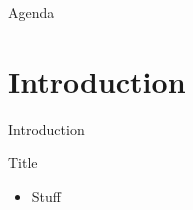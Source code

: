 {\aauwavesbg%
\begin{frame} %
    \titlepage
\end{frame}}

\begin{frame}{Agenda}{}
\tableofcontents
\end{frame}

\section{Introduction}
\begin{frame}{Introduction}{}
\begin{block}{Title}
    \begin{itemize}
        \item Stuff
    \end{itemize}
\end{block}
\end{frame}